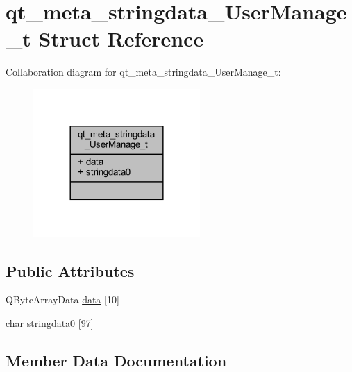 \hypertarget{structqt__meta__stringdata___user_manage__t}{}\section{qt\+\_\+meta\+\_\+stringdata\+\_\+\+User\+Manage\+\_\+t Struct Reference}
\label{structqt__meta__stringdata___user_manage__t}


Collaboration diagram for qt\+\_\+meta\+\_\+stringdata\+\_\+\+User\+Manage\+\_\+t\+:
\nopagebreak
\begin{figure}[H]
\begin{center}
\leavevmode
\includegraphics[width=180pt]{structqt__meta__stringdata___user_manage__t__coll__graph}
\end{center}
\end{figure}
\subsection*{Public Attributes}
\begin{DoxyCompactItemize}
\item 
Q\+Byte\+Array\+Data \mbox{\hyperlink{structqt__meta__stringdata___user_manage__t_a644ecc5dec551c333874e6a8b9303489}{data}} \mbox{[}10\mbox{]}
\item 
char \mbox{\hyperlink{structqt__meta__stringdata___user_manage__t_aa319f7f2d82ad1b5760b67e7ba1f20b0}{stringdata0}} \mbox{[}97\mbox{]}
\end{DoxyCompactItemize}


\subsection{Member Data Documentation}
\mbox{\label{structqt__meta__stringdata___user_manage__t_a644ecc5dec551c333874e6a8b9303489}} 
